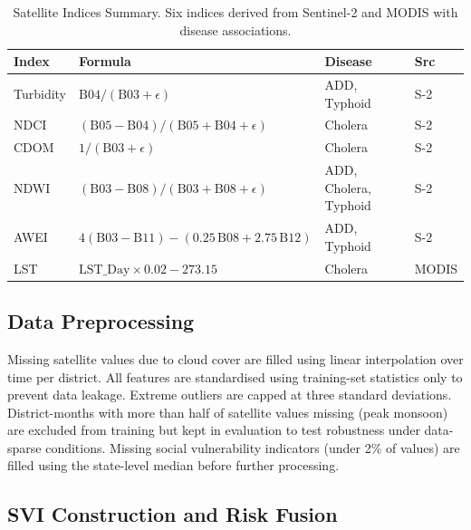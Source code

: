 \documentclass[conference]{IEEEtran}
\begin{document}
\begin{table}[!t]
\caption{Satellite Indices Summary. Six indices derived from Sentinel-2 and MODIS with disease associations.}
\label{tab:indices}
\centering
\renewcommand{\arraystretch}{1.1}
\begin{tabular}{|p{0.8cm}|p{2.85cm}|p{1.55cm}|p{0.75cm}|}
\hline
\textbf{Index} & \textbf{Formula} & \textbf{Disease} & \textbf{Src} \\
\hline
Turbidity & $\text{B04}/(\text{B03}+\epsilon)$ & ADD, Typhoid & S-2 \\
\hline
NDCI & $(\text{B05}-\text{B04})/(\text{B05}+\text{B04}+\epsilon)$ & Cholera & S-2 \\
\hline
CDOM & $1/(\text{B03}+\epsilon)$ & Cholera & S-2 \\
\hline
NDWI & $(\text{B03}-\text{B08})/(\text{B03}+\text{B08}+\epsilon)$ & ADD, Cholera, Typhoid & S-2 \\
\hline
AWEI & $4(\text{B03}-\text{B11})-(0.25\,\text{B08}+2.75\,\text{B12})$ & ADD, Typhoid & S-2 \\
\hline
LST & $\text{LST\_Day}\times 0.02 - 273.15$ & Cholera & MODIS \\
\hline
\end{tabular}
\end{table}

\subsection{Data Preprocessing}

Missing satellite values due to cloud cover are filled using linear
interpolation over time per district. All features are standardised
using training-set statistics only to prevent data leakage.
Extreme outliers are capped at three standard deviations. District-months
with more than half of satellite values missing (peak monsoon) are
excluded from training but kept in evaluation to test robustness under
data-sparse conditions. Missing social vulnerability indicators
(under 2\% of values) are filled using the state-level median before
further processing.

\subsection{SVI Construction and Risk Fusion}
\end{document}
